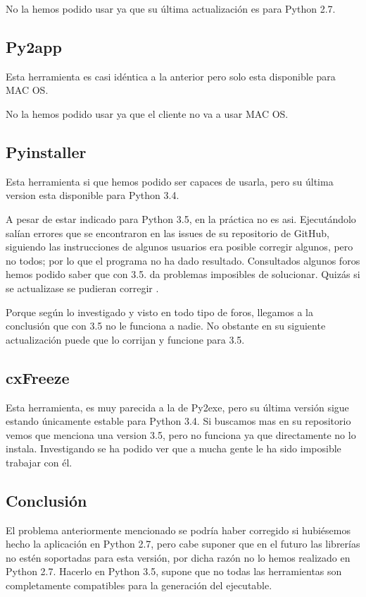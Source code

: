 No la hemos podido usar ya que su última actualización es para Python 2.7.

\subsection{Py2app}
Esta herramienta es casi idéntica a la anterior pero solo esta disponible para MAC OS.

No la hemos podido usar ya que el cliente no va a usar MAC OS.

\subsection{Pyinstaller}
Esta herramienta \cite{Pyinstaller} si que hemos podido ser capaces de usarla, pero su última version esta disponible para Python 3.4.

A pesar  de estar indicado para Python 3.5, en la práctica no es asi. Ejecutándolo salían errores que se encontraron en las issues de su repositorio de GitHub, siguiendo las instrucciones de algunos usuarios era posible corregir algunos, pero no todos; por lo que el programa no ha dado resultado. 
Consultados algunos foros hemos podido saber que con 3.5. da problemas imposibles de solucionar. Quizás si se actualizase se pudieran corregir . 

Porque según lo investigado y visto en todo tipo de foros, llegamos a la conclusión que con 3.5 no le funciona a nadie.
No obstante en su siguiente actualización puede que lo corrijan y funcione para 3.5.

\subsection{cxFreeze}
Esta herramienta, es muy parecida a la de Py2exe, pero su última versión sigue estando únicamente estable para Python 3.4. 
Si buscamos mas en su repositorio vemos que menciona una version 3.5, pero no funciona ya que directamente no lo instala. Investigando se ha podido ver que a mucha gente le ha sido imposible trabajar con él. 

\subsection{Conclusión}
El problema anteriormente mencionado se podría haber corregido si hubiésemos hecho la aplicación en Python 2.7, pero cabe suponer que en el futuro las librerías no estén soportadas para esta versión, por dicha razón no lo hemos realizado en Python 2.7.
Hacerlo en Python 3.5, supone que no todas las herramientas son completamente compatibles para la generación del ejecutable.

